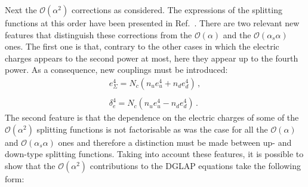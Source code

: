 Next the $\mathcal{O}(\alpha^2)$ corrections as considered.  The
expressions of the splitting functions at this order have been
presented in Ref.~\cite{deFlorian:2016gvk}. There are two relevant new
features that distinguish these corrections from the
$\mathcal{O}(\alpha)$ and the $\mathcal{O}(\alpha_s\alpha)$ ones. The
first one is that, contrary to the other cases in which the electric
charges appears to the second power at most, here they appear up to
the fourth power. As a consequence, new couplings must be introduced:
\begin{equation}
\begin{array}{l}
e_{\Sigma}^4 = N_c(n_{u} e_u^4 + n_{d} e_d^4)\,,\\
\\
\delta_e^4 = N_c(n_{u} e_u^4 - n_{d} e_d^4)\,.
\end{array}
\end{equation}
The second feature is that the dependence on the electric charges of
some of the $\mathcal{O}(\alpha^2)$ splitting functions is not
factorisable as was the case for all the $\mathcal{O}(\alpha)$ and
$\mathcal{O}(\alpha_s\alpha)$ ones and therefore a distinction must be
made between up- and down-type splitting functions. Taking into
account these features, it is possible to show that the
$\mathcal{O}(\alpha^2)$ contributions to the DGLAP equations take the
following form:
